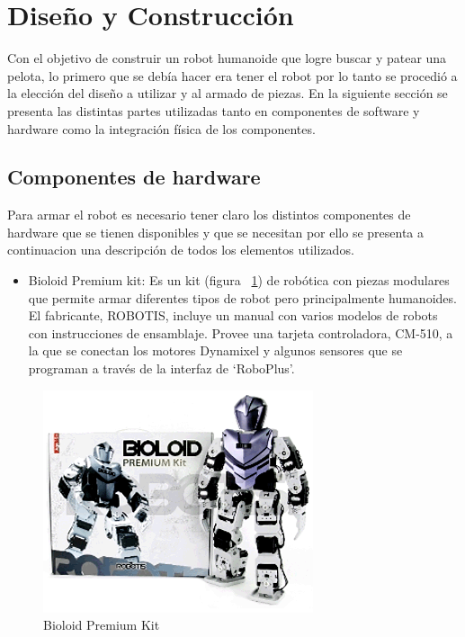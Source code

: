 
\label{chapter:diseno}
\section{Diseño y Construcción}

Con el objetivo de construir un robot humanoide que logre buscar y patear una pelota, lo primero que se debía hacer era tener el robot por lo tanto se procedió a la elección del diseño a utilizar y al armado de piezas. En la siguiente sección se presenta las distintas partes utilizadas tanto en componentes de software y hardware como la integración física de los componentes.

\subsection{Componentes de hardware}
Para armar el robot es necesario tener claro los distintos componentes de hardware que se tienen disponibles y que se necesitan por ello se presenta a continuacion una descripción de todos los elementos utilizados. 

\begin{itemize}
\item Bioloid Premium kit: Es un kit (figura ~\ref{fig:kit}) de robótica con piezas modulares que permite armar diferentes tipos de robot pero principalmente humanoides. El fabricante, ROBOTIS, incluye un manual con varios modelos de robots con instrucciones de ensamblaje. Provee una tarjeta controladora, CM-510, a la que se conectan los motores Dynamixel y algunos sensores que se programan a través de la interfaz de ‘RoboPlus’. \cite{robotics}

\end{itemize}

\begin{figure}[hbtp]

\centering
\includegraphics[scale=0.5]{imagenes/product_bioloid17.png}
\caption{Bioloid Premium Kit}
\label{fig:kit}
\end{figure}

